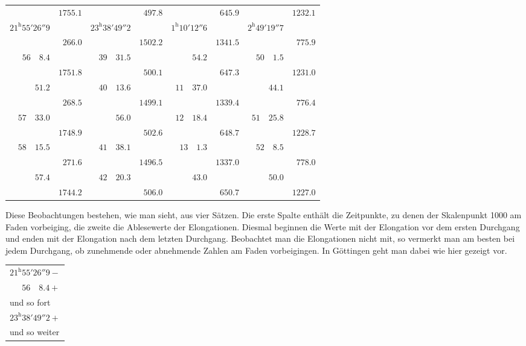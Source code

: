 \begin{center}
\begingroup\fontsize{9}{11}\selectfont\setlength{\tabcolsep}{2pt}
\begin{tabular}{r|r||r|r||r|r||r|r}
& $1755.1$ && $497.8$ && $645.9$ && $1232.1$ \\[-4pt]
$21^{\mathrm{h}}55'26''9$ && $23^{\mathrm{h}}38'49''2$ && $1^{\mathrm{h}}10'12''6$ && $2^{\mathrm{h}}49'19''7$ & \\[-4pt]
& $266.0$ && $1502.2$ && $1341.5$ && $775.9$ \\[-4pt]
$56\quad8.4$ && $39\quad31.5$ && $54.2$ && $50\quad1.5$ & \\[-4pt]
& $1751.8$ && $500.1$ && $647.3$ && $1231.0$ \\[-4pt]
$51.2$ && $40\quad13.6$ && $11\quad37.0$ && $44.1$ & \\[-4pt]
& $268.5$ && $1499.1$ && $1339.4$ && $776.4$ \\[-4pt]
$57\quad33.0$ && $56.0$ && $12\quad18.4$ && $51\quad25.8$ & \\[-4pt]
& $1748.9$ && $502.6$ && $648.7$ && $1228.7$ \\[-4pt]
$58\quad15.5$ && $41\quad38.1$ && $13\quad1.3$ && $52\quad8.5$ & \\[-4pt]
& $271.6$ && $1496.5$ && $1337.0$ && $778.0$ \\[-4pt]
$57.4$ && $42\quad20.3$ && $43.0$ && $50.0$ & \\[-4pt]
& $1744.2$ && $506.0$ && $650.7$ && $1227.0$
\end{tabular}\endgroup
\end{center}

Diese Beobachtungen bestehen, wie man sieht, aus vier Sätzen. Die erste Spalte enthält die Zeitpunkte, zu denen der Skalenpunkt 1000 am Faden vorbeiging, die zweite die Ablesewerte der Elongationen. Diesmal beginnen die Werte mit der Elongation vor dem ersten Durchgang und enden mit der Elongation nach dem letzten Durchgang. Beobachtet man die Elongationen nicht mit, so vermerkt man am besten bei jedem Durchgang, ob zunehmende oder abnehmende Zahlen am Faden vorbeigingen. In Göttingen geht man dabei wie hier gezeigt vor.
\begin{center}
\begin{tabular}{l}
$21^{\mathrm{h}}55'26''9-$ \\
$\phantom{21^{\mathrm{h}}}56\quad8.4+$ \\
und so fort \\
$23^{\mathrm{h}}38'49''2+$ \\
und so weiter
\end{tabular}
\end{center}

